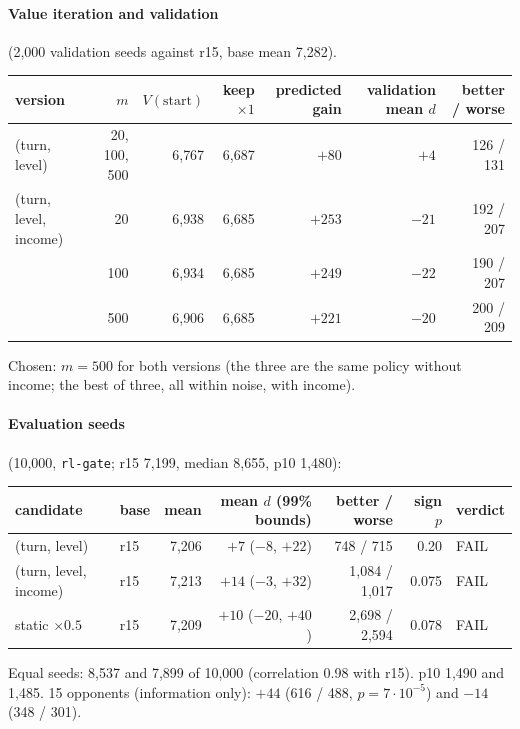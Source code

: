 \documentclass{../polyexp}
\begin{document}
\paragraph{Value iteration and validation} (2{,}000 validation seeds against r15, base mean 7{,}282).

\begin{center}\small
\begin{tabular}{lrrrrrr}
\toprule
version & $m$ & $V(\text{start})$ & keep $\times1$ & predicted gain & validation mean $d$ & better / worse \\
\midrule
(turn, level)          & 20, 100, 500 & 6{,}767 & 6{,}687 & $+80$  & $+4$  & 126 / 131 \\
(turn, level, income)  & 20           & 6{,}938 & 6{,}685 & $+253$ & $-21$ & 192 / 207 \\
                       & 100          & 6{,}934 & 6{,}685 & $+249$ & $-22$ & 190 / 207 \\
                       & 500          & 6{,}906 & 6{,}685 & $+221$ & $-20$ & 200 / 209 \\
\bottomrule
\end{tabular}
\end{center}

Chosen: $m = 500$ for both versions (the three are the same policy without income; the best of three, all within
noise, with income).

\paragraph{Evaluation seeds} (10{,}000, \texttt{rl-gate}; r15 7{,}199, median 8{,}655, p10 1{,}480):

\begin{center}\small
\begin{tabular}{llrrrrl}
\toprule
candidate & base & mean & mean $d$ (99\% bounds) & better / worse & sign $p$ & verdict \\
\midrule
(turn, level)         & r15 & 7{,}206 & $+7$ ($-8$, $+22$)   & 748 / 715     & 0.20  & FAIL \\
(turn, level, income) & r15 & 7{,}213 & $+14$ ($-3$, $+32$)  & 1{,}084 / 1{,}017 & 0.075 & FAIL \\
static $\times0.5$ & r15 & 7{,}209 & $+10$ ($-20$, $+40$) & 2{,}698 / 2{,}594 & 0.078 & FAIL \\
\bottomrule
\end{tabular}
\end{center}

Equal seeds: 8{,}537 and 7{,}899 of 10{,}000 (correlation 0.98 with r15). p10 1{,}490 and 1{,}485. 15 opponents
(information only): $+44$ (616 / 488, $p = 7\cdot10^{-5}$) and $-14$ (348 / 301).
\end{document}
